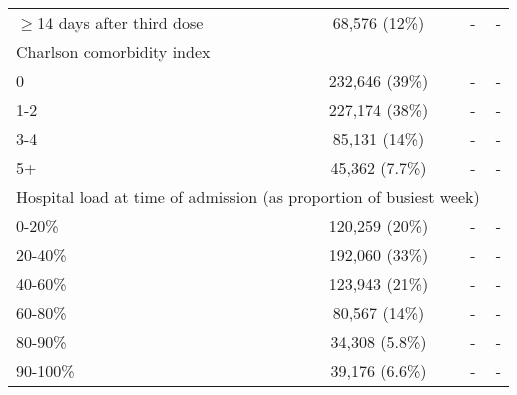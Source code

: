 \begin{longtable}[t]{lccc}
\hspace{1em}$\geq$14 days after third dose & 68,576 (12\%) & - & -\\
Charlson comorbidity index &  &  & \\
\hspace{1em}0 & 232,646 (39\%) & - & -\\
\hspace{1em}1-2 & 227,174 (38\%) & - & -\\
\hspace{1em}3-4 & 85,131 (14\%) & - & -\\
\hspace{1em}5+ & 45,362 (7.7\%) & - & -\\
\multicolumn{3}{l}{Hospital load at time of admission (as proportion of busiest week)}  & \\
\hspace{1em}0-20\% & 120,259 (20\%) & - & -\\
\hspace{1em}20-40\% & 192,060 (33\%) & - & -\\
\hspace{1em}40-60\% & 123,943 (21\%) & - & -\\
\hspace{1em}60-80\% & 80,567 (14\%) & - & -\\
\hspace{1em}80-90\% & 34,308 (5.8\%) & - & -\\
\hspace{1em}90-100\% & 39,176 (6.6\%) & - & -\\
\bottomrule
\end{longtable}
